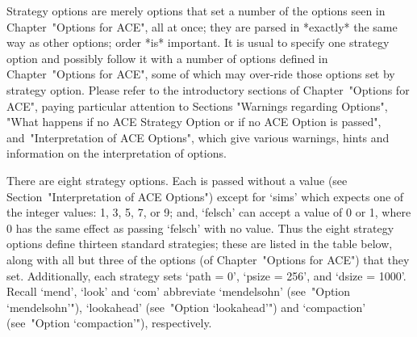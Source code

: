 Strategy options are merely options that set a number of  the  options
seen in Chapter~"Options for ACE", all at once;  they  are  parsed  in
*exactly* the same way as other options; order *is* important.  It  is
usual to specify one strategy option and possibly  follow  it  with  a
number of options defined in Chapter~"Options for ACE", some of  which
may over-ride those options set by strategy option.  Please  refer  to
the  introductory  sections  of  Chapter~"Options  for  ACE",   paying
particular attention to Sections "Warnings regarding  Options",  "What
happens if no ACE Strategy Option or if  no  ACE  Option  is  passed",
and~"Interpretation of ACE  Options",  which  give  various  warnings,
hints and information on the interpretation of options.

There are eight strategy options. Each is passed without a value  (see
Section~"Interpretation of  ACE  Options")  except  for  `sims'  which
expects one of the integer values: 1, 3, 5, 7, or 9; and, `felsch' can
accept a value of 0 or 1, where 0  has  the  same  effect  as  passing
`felsch' with  no  value.  Thus  the  eight  strategy  options  define
thirteen standard strategies; these are listed  in  the  table  below,
along with all but three of the options (of Chapter~"Options for ACE")
that they set. Additionally, each strategy sets `path = 0',  `psize  =
256', and `dsize = 1000'. Recall `mend', `look' and  `com'  abbreviate
`mendelsohn'  (see~"Option  `mendelsohn'"),  `lookahead'  (see~"Option
`lookahead'")   and    `compaction'    (see~"Option    `compaction'"),
respectively.

